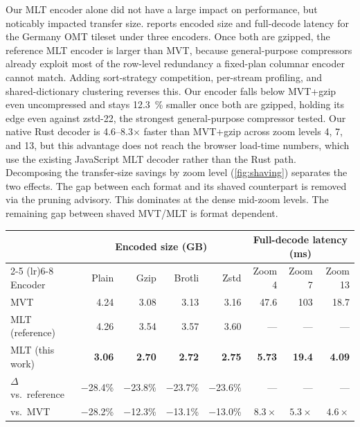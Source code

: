 Our \ac{MLT} encoder alone did not have a large impact on performance, but noticably impacted transfer size.
 reports encoded size and full-decode latency for the Germany \ac{OMT} tileset under three encoders.
Once both are gzipped, the reference \ac{MLT} encoder is larger than \ac{MVT}, because general-purpose compressors already exploit most of the row-level redundancy a fixed-plan columnar encoder cannot match.
Adding sort-strategy competition, per-stream profiling, and shared-dictionary clustering reverses this.
Our encoder falls below \ac{MVT}+gzip even uncompressed and stays \qty{12.3}{\percent} smaller once both are gzipped, holding its edge even against zstd-22, the strongest general-purpose compressor tested.
Our native Rust decoder is \numrange{4.6}{8.3}$\times$ faster than \ac{MVT}+gzip across zoom levels 4, 7, and 13, but this advantage does not reach the browser load-time numbers, which use the existing JavaScript MLT decoder rather than the Rust path.
Decomposing the transfer-size savings by zoom level (\cref{fig:shaving}) separates the two effects.
The gap between each format and its shaved counterpart is removed via the pruning advisory.
This dominates at the dense mid-zoom levels. The remaining gap between shaved \ac{MVT}/\ac{MLT} is format dependent.

\begin{table}
{\setlength{\tabcolsep}{4.5pt}%
\begin{tabular}{l rrrr rrr}
\toprule
& \multicolumn{4}{c}{Encoded size (GB)} & \multicolumn{3}{c}{Full-decode latency (ms)} \\
\cmidrule(lr){2-5} \cmidrule(lr){6-8}
Encoder & Plain & Gzip & Brotli & Zstd & Zoom 4 & Zoom 7 & Zoom 13 \\
\midrule
MVT & 4.24 & 3.08 & 3.13 & 3.16 & 47.6 & 103 & 18.7 \\
MLT (reference) & 4.26 & 3.54 & 3.57 & 3.60 & --- & --- & --- \\
MLT (this work) & \textbf{3.06} & \textbf{2.70} & \textbf{2.72} & \textbf{2.75} & \textbf{5.73} & \textbf{19.4} & \textbf{4.09} \\
\midrule
$\Delta$ vs.\ reference & \num{-28.4}\% & \num{-23.8}\% & \num{-23.7}\% & \num{-23.6}\% & --- & --- & --- \\
vs.\ MVT & \num{-28.2}\% & \num{-12.3}\% & \num{-13.1}\% & \num{-13.0}\% & $8.3\times$ & $5.3\times$ & $4.6\times$ \\
\bottomrule
\end{tabular}}
\label{tab:encoder}
\end{table}

